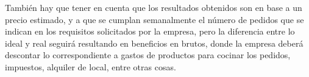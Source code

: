 También hay que tener en cuenta que los resultados obtenidos son en base a un precio estimado, y a que se cumplan semanalmente el número de pedidos que se indican en los requisitos solicitados por la empresa, pero la diferencia entre lo ideal y real seguirá resultando en beneficios en brutos, donde la empresa deberá descontar lo correspondiente a gastos de productos para cocinar los pedidos, impuestos, alquiler de local, entre otras cosas.




 


